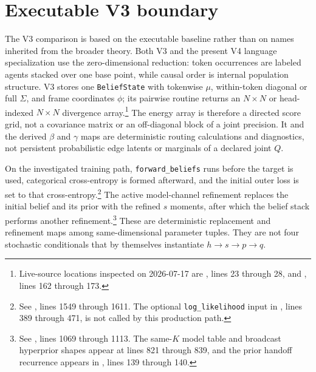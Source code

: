 \section{Executable V3 boundary}

The V3 comparison is based on the executable baseline rather than on names inherited from the broader theory. Both V3 and the present V4 language specialization use the zero-dimensional reduction: token occurrences are labeled agents stacked over one base point, while causal order is internal population structure. V3 stores one \texttt{BeliefState} with tokenwise $\mu$, within-token diagonal or full $\Sigma$, and frame coordinates $\phi$; its pairwise routine returns an $N\times N$ or head-indexed $N\times N$ divergence array.\footnote{Live-source locations inspected on 2026-07-17 are , lines 23 through 28, and , lines 162 through 173.} The energy array is therefore a directed score grid, not a covariance matrix or an off-diagonal block of a joint precision. It and the derived $\beta$ and $\gamma$ maps are deterministic routing calculations and diagnostics, not persistent probabilistic edge latents or marginals of a declared joint $Q$.

On the investigated training path, \texttt{forward\_beliefs} runs before the target is used, categorical cross-entropy is formed afterward, and the initial outer loss is set to that cross-entropy.\footnote{See , lines 1549 through 1611. The optional \texttt{log\_likelihood} input in , lines 389 through 471, is not called by this production path.} The active model-channel refinement replaces the initial belief and its prior with the refined $s$ moments, after which the belief stack performs another refinement.\footnote{See , lines 1069 through 1113. The same-$K$ model table and broadcast hyperprior shapes appear at lines 821 through 839, and the prior handoff recurrence appears in , lines 139 through 140.} These are deterministic replacement and refinement maps among same-dimensional parameter tuples. They are not four stochastic conditionals that by themselves instantiate $h\to s\to p\to q$.

